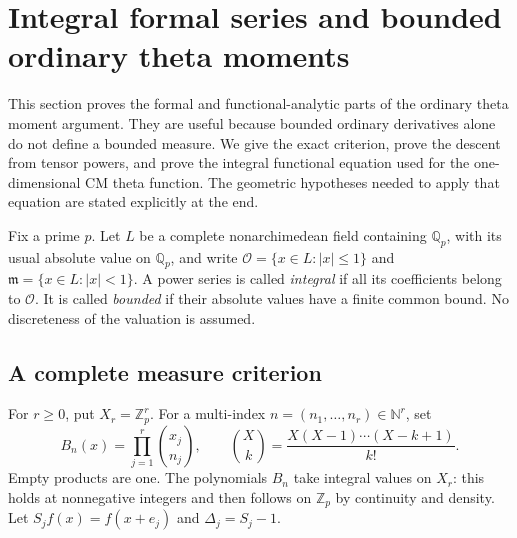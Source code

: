 \section{Integral formal series and bounded ordinary theta moments}
\label{ot-section}

This section proves the formal and functional-analytic parts of the
ordinary theta moment argument.  They are useful because bounded
ordinary derivatives alone do not define a bounded measure.  We give
the exact criterion, prove the descent from tensor powers, and prove
the integral functional equation used for the one-dimensional CM
theta function.  The geometric hypotheses needed to apply that
equation are stated explicitly at the end.

Fix a prime $p$.  Let $L$ be a complete nonarchimedean field containing
$\mathbb Q_p$, with its usual absolute value on $\mathbb Q_p$, and
write $\mathcal O=\{x\in L:|x|\le1\}$ and
$\mathfrak m=\{x\in L:|x|<1\}$.  A power series is called
\emph{integral} if all its coefficients belong to $\mathcal O$.
It is called \emph{bounded} if their absolute values have a finite
common bound.  No discreteness of the valuation is assumed.

\subsection{A complete measure criterion}

For $r\ge0$, put $X_r=\mathbb Z_p^r$.  For a multi-index
$n=(n_1,\ldots,n_r)\in\mathbb N^r$, set
\[
 B_n(x)=\prod_{j=1}^r\binom{x_j}{n_j},\qquad
 \binom Xk=\frac{X(X-1)\cdots(X-k+1)}{k!}.
 \tag{OT1}
\]
Empty products are one.  The polynomials $B_n$ take integral values
on $X_r$: this holds at nonnegative integers and then follows on
$\mathbb Z_p$ by continuity and density.
Let $S_jf(x)=f(x+e_j)$ and $\Delta_j=S_j-1$.

